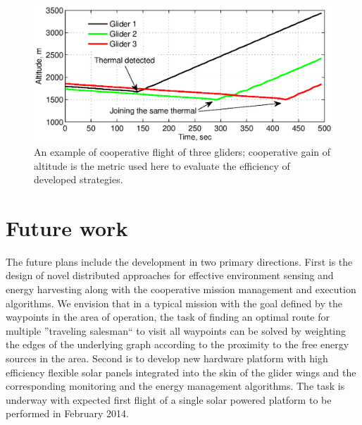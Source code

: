 \documentclass{ifacconf}
\newcommand{\squeezeup}{\vspace{-2.0mm}}
\begin{document}
\begin{figure}[thpb]
  \centering
  \includegraphics[scale=0.5]{Figures/Coop_gain_altitude.eps}
  \caption{An example of cooperative flight of three gliders; cooperative gain of altitude is the
  metric used here to evaluate the efficiency of developed strategies.}
  \label{fig:CoopFlightHeight}
\end{figure}

\section{Future work}
\label{sec:Future}
\squeezeup

The future plans include the development in two primary directions. First is the design
of novel distributed approaches for effective environment sensing and energy harvesting
along with the cooperative mission management and execution algorithms. We envision that
in a typical mission with the goal defined by the waypoints in the area of operation, the
task of finding an optimal route for multiple ''traveling salesman`` to visit all
waypoints can be solved by weighting the edges of the underlying graph according to the
proximity to the free energy sources in the area. Second is to develop new hardware
platform with high efficiency flexible solar panels integrated into the skin of the
glider wings and the corresponding monitoring and the energy management algorithms. The
task is underway with expected first flight of a single solar powered platform to be
performed in February 2014.

%
\end{document}
